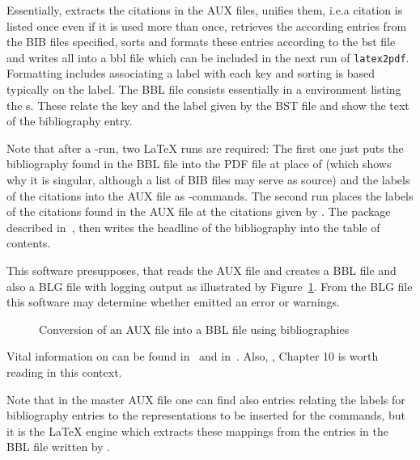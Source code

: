 Essentially,  extracts the citations in the AUX files, 
unifies them, i.e.\@ a citation is listed once even if it is used more than once, 
retrieves the according entries from the BIB files specified, 
sorts and formats these entries 
according to the \gls{bst} file and writes all into a \gls{bbl} file 
which can be included in the next run of \texttt{latex2pdf}. 
Formatting includes associating a label with each key 
and sorting is based typically on the label. 
The BBL file consists essentially in a  environment 
listing the s. 
These relate the key and the label given by the BST file 
and show the text of the bibliography entry. 

Note that after a -run, 
two \LaTeX{} runs are required: 
The first one just puts the bibliography found in the BBL file 
into the PDF file at place of  
(which shows why it is singular, although a list of BIB files may serve as source)
and the labels of the citations into the AUX file 
as -commands. 
The second run places the labels of the citations found in the AUX file 
at the citations given by . 
The package  described in~\cite{TocBibIndP}, 
then writes the headline of the bibliography 
into the table of contents.



This software presupposes, that  reads the AUX file 
and creates a BBL file and also a BLG file with logging output 
as illustrated by Figure~\ref{fig:aux2bbl}. 
From the BLG file this software may determine 
whether  emitted an error or warnings. 


\begin{figure}[htb]
\centering
{}
\caption{\label{fig:aux2bbl}
Conversion of an AUX file into a BBL file using bibliographies}
\end{figure}

Vital information on  can be found in~\cite{BibPat} 
and in~\cite{BibMar}. 
Also, \cite{Gra}, Chapter 10 is worth reading in this context. 

Note that in the master AUX file one can find also entries  
relating the labels for bibliography entries to the representations 
to be inserted for the  commands, 
but it is the \LaTeX{} engine which extracts these mappings 
from the  entries in the BBL file written by . 


